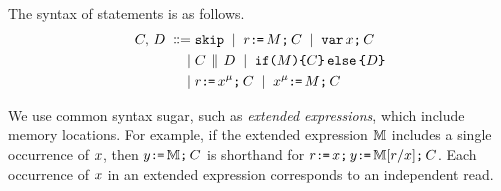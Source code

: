 \begin{comment}
\footnote{We only consider executions where register state is empty in
  forked threads.  Given item~\ref{pre-acquire} of
  Definition~\ref{def:prefix}, a sufficient condition is that parallel
  composition is always preceded by an acquire fence, as in programs of the
  form:
  \begin{displaymath}
    \VAR\vec{\aLoc}\SEMI
    \vec{\aLoc}\GETS\vec{0}\SEMI
    \vec{\bLoc}\GETS\vec{0}\SEMI
    \FENCE\SEMI
    (\aCmd^1 \PAR \cdots \PAR \aCmd^n)
  \end{displaymath}
  where $\aCmd^1$, \ldots, $\aCmd^n$ do not include $\PAR$.  To avoid clutter
  in drawings, we often drop the explicit fence.}.
\end{comment}


The syntax of statements is as follows.
\begin{align*}
C,\,D
\;\mathrel{\mathord{\vcentcolon}\mkern-1mu\mathord{\vcentcolon}\mathord{{=}}}\;& \texttt{skip}
\;\mathrel{|}\; r\texttt{:}\mkern-1mu\texttt{=}\,M\texttt{;}\,\allowbreak C
\;\mathrel{|}\; \texttt{var}\,x\texttt{;}\,\allowbreak C
\\
\;\mathrel{|}\;&C \,\mathbin{\|}\, D
\;\mathrel{|}\; \texttt{if}\allowbreak\texttt{(}M\texttt{)} \allowbreak\texttt{\{} C \texttt{\}}\,\allowbreak\texttt{else}\allowbreak\,\texttt{\{} D \texttt{\}}
\\
\;\mathrel{|}\;& r\texttt{:}\mkern-1mu\texttt{=}\,x^{\mu}\texttt{;}\,\allowbreak C 
\;\mathrel{|}\; x^{\mu}\texttt{:}\mkern-1mu\texttt{=}\,M\texttt{;}\,\allowbreak C
\end{align*}



We use common syntax sugar, such as \emph{extended expressions}, which include
memory locations.  For example, if the extended expression $\mathbb{M}$ includes
a single occurrence of $x$, then $y\texttt{:}\mkern-1mu\texttt{=}\,\mathbb{M}\texttt{;}\,\allowbreak C$ is
shorthand for $r\texttt{:}\mkern-1mu\texttt{=}\,x\texttt{;}\,\allowbreak y\texttt{:}\mkern-1mu\texttt{=}\,\mathbb{M}[r/x]\texttt{;}\,\allowbreak C$.
Each occurrence of $x$ in an extended expression corresponds to an
independent read.

